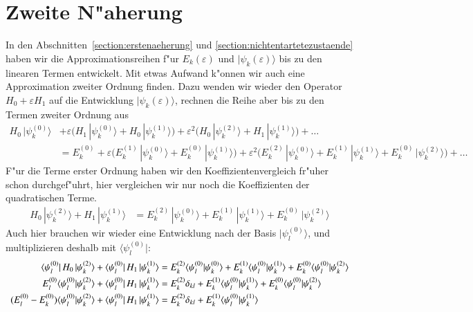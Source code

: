 \section{Zweite N"aherung}
In den Abschnitten~\ref{section:erstenaeherung} und
\ref{section:nichtentartetezustaende} haben wir die Approximationsreihen
f"ur $E_k(\varepsilon)$ und $|\psi_k(\varepsilon)\rangle$
bis zu den linearen Termen entwickelt.
Mit etwas Aufwand k"onnen wir auch eine Approximation zweiter Ordnung
finden.
Dazu wenden wir wieder den Operator $H_0+\varepsilon H_1$
auf die Entwicklung $|\psi_k(\varepsilon)\rangle$, rechnen die Reihe aber bis
zu den Termen zweiter Ordnung aus
\begin{align*}
H_0\,|\psi_k^{(0)}\rangle
&+
\varepsilon
\bigl(
H_1\,|\psi_k^{(0)}\rangle
+
H_0\,|\psi_k^{(1)}\rangle
\bigr)
+
\varepsilon^2
\bigl(
H_0\,|\psi_k^{(2)}\rangle
+
H_1\,|\psi_k^{(1)}\rangle
\bigr)
+
\dots
\\
&=
E_k^{(0)}
+
\varepsilon
\bigl(
E_k^{(1)}\,|\psi_k^{(0)}\rangle
+
E_k^{(0)}\,|\psi_k^{(1)}\rangle
\bigr)
+
\varepsilon^2
\bigl(
E_k^{(2)}\,|\psi_k^{(0)}\rangle
+
E_k^{(1)}\,|\psi_k^{(1)}\rangle
+
E_k^{(0)}\,|\psi_k^{(2)}\rangle
\bigr)
+
\dots
\end{align*}
F"ur die Terme erster Ordnung haben wir den Koeffizientenvergleich
fr"uher schon durchgef"uhrt, hier vergleichen wir nur noch die
Koeffizienten der quadratischen Terme.
\begin{align*}
H_0\,|\psi_k^{(2)}\rangle
+
H_1\,|\psi_k^{(1)}\rangle
&=
E_k^{(2)}\,|\psi_k^{(0)}\rangle
+
E_k^{(1)}\,|\psi_k^{(1)}\rangle
+
E_k^{(0)}\,|\psi_k^{(2)}\rangle
\end{align*}
Auch hier brauchen wir wieder eine Entwicklung nach der Basis
$|\psi_l^{(0)}\rangle$, und multiplizieren deshalb mit
$\langle\psi_l^{(0)}|$:
\begin{align}
\langle\psi_l^{(0)}|\,H_0\,|\psi_k^{(2)}\rangle
+
\langle\psi_l^{(0)}|\,H_1\,|\psi_k^{(1)}\rangle
&=
E_k^{(2)}\langle\psi_l^{(0)}|\psi_k^{(0)}\rangle
+
E_k^{(1)}\langle\psi_l^{(0)}|\psi_k^{(1)}\rangle
+
E_k^{(0)}\langle\psi_l^{(0)}|\psi_k^{(2)}\rangle
\notag
\\
E_l^{(0)}\langle\psi_l^{(0)}|\psi_k^{(2)}\rangle
+
\langle\psi_l^{(0)}|\,H_1\,|\psi_k^{(1)}\rangle
&=
E_k^{(2)}\delta_{kl}
+
E_k^{(1)}\langle\psi_l^{(0)}|\psi_k^{(1)}\rangle
+
E_k^{(0)}\langle\psi_l^{(0)}|\psi_k^{(2)}\rangle
\notag
\\
(E_l^{(0)}-E_k^{(0)})\langle\psi_l^{(0)}|\psi_k^{(2)}\rangle
+
\langle\psi_l^{(0)}|\,H_1\,|\psi_k^{(1)}\rangle
&=
E_k^{(2)}\delta_{kl}
+
E_k^{(1)}\langle\psi_l^{(0)}|\psi_k^{(1)}\rangle
\label{skript:zweitenaeherung}
\end{align}
